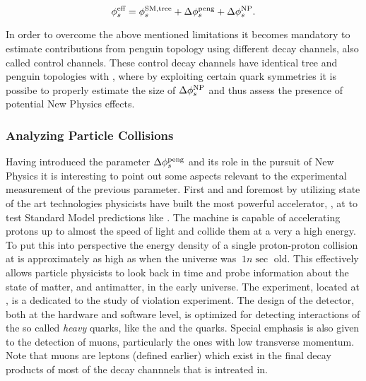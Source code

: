 \begin{equation}
\centering
 \phis^{\text {eff}} = \phis^{\tiny \text{SM,tree}} + \Delta\phiS{peng} + \Delta\phis^{\tiny \text{NP}}.
 \label{app_phis_sm_peng}
\end{equation}

In order to overcome the above mentioned limitations it becomes mandatory to estimate
contributions from penguin topology using different decay channels, also called control channels.
These control decay channels have identical tree and penguin topologies with \BsJpsiPhi, where
by exploiting certain quark symmetries it is possibe to properly estimate the size of
$\Delta\phi_{s}^{\tiny \text{NP}}$ and thus assess the presence of potential New Physics effects.

\subsubsection{Analyzing Particle Collisions}
Having introduced the parameter $\Delta\phi_{s}^{\tiny\text{peng}}$ and its role in the pursuit of New Physics
it is interesting to point out some aspects relevant to the experimental measurement of the previous parameter.
First and and foremost by utilizing state of the art technologies physicists have built the most
powerful accelerator, \lhc, at \cern to test Standard Model predictions like \phis. The machine is
capable of accelerating protons up to almost the speed of light and collide them at a very a high energy.
To put this into perspective the energy density of a single proton-proton collision at \lhc is approximately
as high as when the universe was $~1 n\sec$ old. This effectively allows particle physicists to look
back in time and probe information about the state of matter, and antimatter, in the early universe.
The \lhcb experiment, located at \cern, is a dedicated to the study of \CP violation experiment.
The design of the detector, both at the hardware and software level, is optimized for detecting
interactions of the so called {\it heavy} quarks, like the \bquark and the \cquark quarks.
Special emphasis is also given to the detection of muons, particularly the ones with low
transverse momentum. Note that muons are leptons (defined earlier) which exist in the final decay products
of most of the decay channnels that \lhcb is intreated in.

